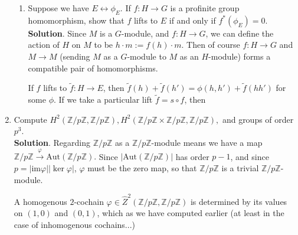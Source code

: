 \documentclass[11pt]{amsart}
\theoremstyle{named}
\newcommand{\Zp}{\mathbb{Z}/p\mathbb{Z}}
\begin{document}
\begin{enumerate}[label=\textbf{(\arabic*)},wide, labelwidth=!, labelindent=0pt]
\begin{enumerate}[label=\textbf{\alph*.}, wide, labelwidth=!, labelindent=20pt]
\item Suppose we have $E \leftrightarrow \phi_E$. If $f: H \rightarrow G$ is a profinite group homomorphism, show that $f$ lifts to $E$ if and only if $f^*(\phi_E) = 0.$
\newline \\
\noindent\textbf{Solution}. Since $M$ is a $G$-module, and $f: H \rightarrow G$, we can define the action of $H$ on $M$ to be $h \cdot m := f(h) \cdot m.$ Then of course $f : H \rightarrow G$ and $M \rightarrow M$ (sending $M$ as a $G$-module to $M$ as an $H$-module) forms a compatible pair of homomorphisms.

If $f$ lifts to $\tilde{f} : H \rightarrow E$, then $\tilde{f}(h) + \tilde{f}(h') = \phi(h, h') + \tilde{f}(hh')$ for some $\phi$. If we take a particular lift $\tilde{f} = s \circ f$, then 
\end{enumerate}
\item Compute $H^2(\Zp, \Zp), H^2(\Zp \times \Zp, \Zp),$ and groups of order $p^3$.
\newline \\
\noindent\textbf{Solution}. Regarding $\Zp$ as a $\Zp$-module means we have a map $\Zp \xrightarrow{\varphi} \mathrm{Aut}(\Zp).$ Since $|\mathrm{Aut}(\Zp)|$ has order $p - 1$, and since $p = |\mathrm{im} \varphi| | \ker \varphi |$, $\varphi$ must be the zero map, so that $\Zp$ is a trivial $\Zp$-module.

A homogenous $2$-cochain $\varphi \in \widehat{Z}^2(\Zp, \Zp)$ is determined by its values on $(1, 0)$ and $(0, 1)$, which as we have computed earlier (at least in the case of inhomogenous cochains...) 
\newline\\
\end{enumerate}
\end{document}
